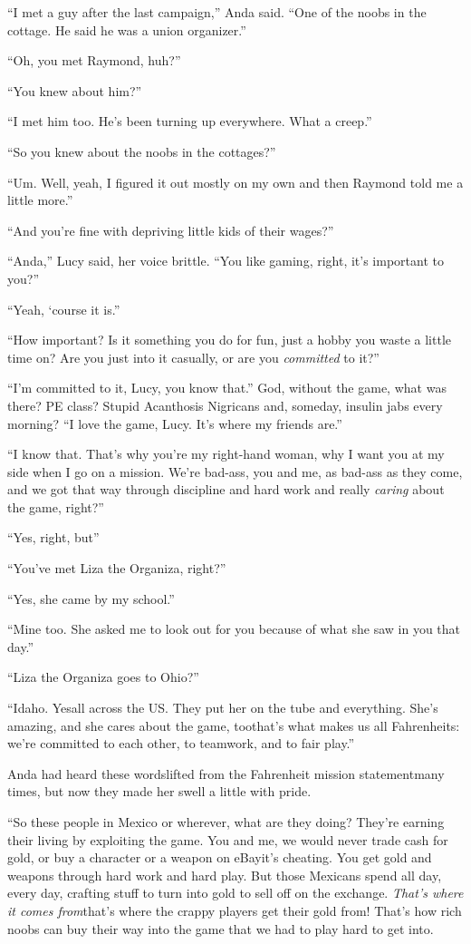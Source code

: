 “I met a guy after the last campaign,” Anda said. “One of the noobs
in the cottage. He said he was a union organizer.”

“Oh, you met Raymond, huh?”

“You knew about him?”

“I met him too. He’s been turning up everywhere. What a creep.”

“So you knew about the noobs in the cottages?”

“Um. Well, yeah, I figured it out mostly on my own and then Raymond
told me a little more.”

“And you’re fine with depriving little kids of their wages?”

“Anda,” Lucy said, her voice brittle. “You like gaming, right, it’s
important to you?”

“Yeah, ‘course it is.”

“How important? Is it something you do for fun, just a hobby you
waste a little time on? Are you just into it casually, or are you
\emph{committed} to it?”

“I’m committed to it, Lucy, you know that.” God, without the game,
what was there? PE class? Stupid Acanthosis Nigricans and, someday,
insulin jabs every morning? “I love the game, Lucy. It’s where my
friends are.”

“I know that. That’s why you’re my right-hand woman, why I want you
at my side when I go on a mission. We’re bad-ass, you and me, as
bad-ass as they come, and we got that way through discipline and
hard work and really \emph{caring} about the game, right?”

“Yes, right, but\dash{}”

“You’ve met Liza the Organiza, right?”

“Yes, she came by my school.”

“Mine too. She asked me to look out for you because of what she saw
in you that day.”

“Liza the Organiza goes to Ohio?”

“Idaho. Yes\dash{}all across the US. They put her on the tube and
everything. She’s amazing, and she cares about the game, too\dash{}that’s
what makes us all Fahrenheits: we’re committed to each other, to
teamwork, and to fair play.”

Anda had heard these words\dash{}lifted from the Fahrenheit mission
statement\dash{}many times, but now they made her swell a little with
pride.

“So these people in Mexico or wherever, what are they doing?
They’re earning their living by exploiting the game. You and me, we
would never trade cash for gold, or buy a character or a weapon on
eBay\dash{}it’s cheating. You get gold and weapons through hard work and
hard play. But those Mexicans spend all day, every day, crafting
stuff to turn into gold to sell off on the exchange.
\emph{That’s where it comes from}\dash{}that’s where the crappy players
get their gold from! That’s how rich noobs can buy their way into
the game that we had to play hard to get into.

